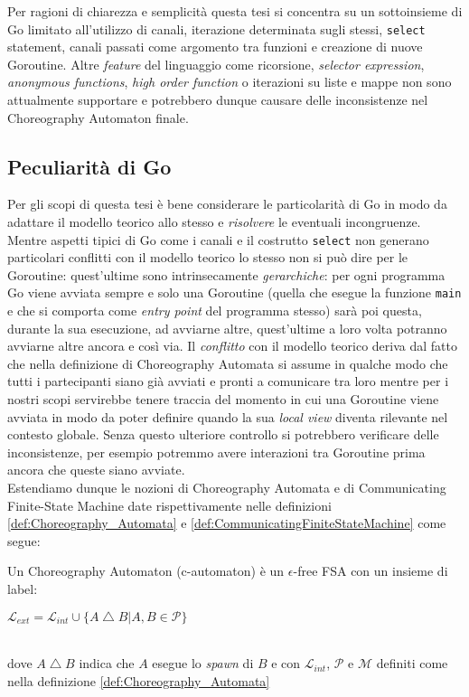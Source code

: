 Per ragioni di chiarezza e semplicità questa tesi si concentra su un sottoinsieme di Go limitato all'utilizzo di canali, iterazione determinata sugli stessi, \texttt{select} statement, canali passati come argomento tra funzioni e creazione di nuove Goroutine. Altre \emph{feature} del linguaggio come ricorsione, \emph{selector expression}, \emph{anonymous functions}, \emph{high order function} o iterazioni su liste e mappe non sono attualmente supportare e potrebbero dunque causare delle inconsistenze nel Choreography Automaton finale.

\subsection{Peculiarità di Go}
Per gli scopi di questa tesi è bene considerare le particolarità di Go in modo da adattare il modello teorico allo stesso e \emph{risolvere} le eventuali incongruenze.\bigskip \\
Mentre aspetti tipici di Go come i canali e il costrutto \texttt{select} non generano particolari conflitti con il modello teorico lo stesso non si può dire per le Goroutine: quest'ultime sono intrinsecamente \emph{gerarchiche}: per ogni programma Go viene avviata sempre e solo una Goroutine (quella che esegue la funzione \texttt{main} e che si comporta come \emph{entry point} del programma stesso) sarà poi questa, durante la sua esecuzione, ad avviarne altre, quest'ultime a loro volta potranno avviarne altre ancora e così via.
Il \emph{conflitto} con il modello teorico deriva dal fatto che nella definizione di Choreography Automata si assume in qualche modo che tutti i partecipanti siano già avviati e pronti a comunicare tra loro mentre per i nostri scopi servirebbe tenere traccia del momento in cui una Goroutine viene avviata in modo da poter definire quando la sua \emph{local view} diventa rilevante nel contesto globale. Senza questo ulteriore controllo si potrebbero verificare delle inconsistenze, per esempio potremmo avere interazioni tra Goroutine prima ancora che queste siano avviate.\bigskip \\
Estendiamo dunque le nozioni di Choreography Automata e di Communicating Finite-State Machine date rispettivamente nelle definizioni \ref{def:Choreography_Automata} e \ref{def:CommunicatingFiniteStateMachine} come segue:

\begin{definition} \label{def:Choreography_Automata_Ext}
    Un Choreography Automaton (c-automaton) è un $\epsilon$-free FSA con un insieme di label:\bigskip \\
    \centerline{$\mathcal{L}_{ext} = \mathcal{L}_{int} \cup \{ A \bigtriangleup B | A, B \in \mathcal{P}\}$} \bigskip \\
    dove $A \bigtriangleup B$ indica che $A$ esegue lo \emph{spawn} di $B$ e con $\mathcal{L}_{int}$, $\mathcal{P}$ e $\mathcal{M}$ definiti come nella definizione \ref{def:Choreography_Automata}
\end{definition}

